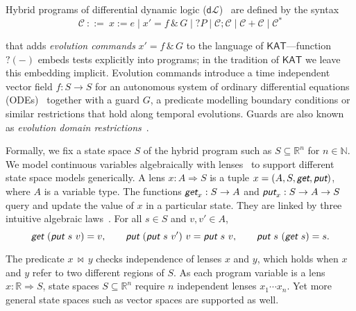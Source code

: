 \documentclass[envcountsame,envcountsect]{llncs}
\newcommand{\KAT}{\mathsf{KAT}}
\newcommand{\dL}{\mathsf{d}\mathcal{L}}
\newcommand{\reals}{\mathbb{R}}
\newcommand{\lput}{\textit{\textsf{put}}}
\newcommand{\lget}{\textit{\textsf{get}}}
\newcommand{\lto}{\Longrightarrow}
\newcommand{\lindep}{\mathop{\,\bowtie\,}}
\begin{document}
Hybrid programs of differential dynamic logic ($\dL$)~\cite{Platzer18}
are defined by the syntax
\begin{equation*}
\mathcal{C}\ ::= \ x:=e \mid x' = f \, \&\, G \mid ?P\mid \mathcal{C};\mathcal{C}\mid \mathcal{C}+\mathcal{C}\mid \mathcal{C}^*
\end{equation*}

that adds \emph{evolution commands} $x' = f \, \&\, G$ to the language
of $\KAT$---function $?(-)$ embeds tests explicitly into programs; in
the tradition of $\KAT$ we leave this embedding implicit.  Evolution
commands introduce a time independent vector field $f:S\to S$ for an
autonomous system of ordinary differential equations
(ODEs)~\cite{Teschl12} together with a guard $G$, a predicate
modelling boundary conditions or similar restrictions that hold along
temporal evolutions.  Guards are also known as \emph{evolution domain
  restrictions}~\cite{DoyenFPP18}.

Formally, we fix a state space $S$ of the hybrid program such as
$S\subseteq \reals^n$ for $n\in\mathbb{N}$. We model continuous
variables algebraically with lenses~\cite{FosterZW16} to support
different state space models generically. A lens $x : A \lto S$ is a
tuple $x = (A, S, \lget, \lput)$, where $A$ is a variable type. The
functions $\lget_x : S \to A$ and $\lput_x : S \to A \to S$ query and
update the value of $x$ in a particular state. They are linked by
three intuitive algebraic laws~\cite{FosterZW16}. For all $s \in S$
and $v, v' \in A$, 
\begin{equation*}
\lget~(\lput~s~v) = v, \qquad \lput~(\lput~s~v')~v = \lput~s~v, \qquad
\lput~s~(\lget~s) = s.
\end{equation*}

The predicate $x \lindep y$ checks independence of lenses $x$ and $y$,
which holds when $x$ and $y$ refer to two different regions of
$S$. As each program variable is a lens $x : \reals \lto S$, state
spaces $S \subseteq \reals^n$ require $n$ independent lenses
$x_1 \cdots x_n$. Yet more general state spaces such as vector spaces
are supported as well.
\end{document}
